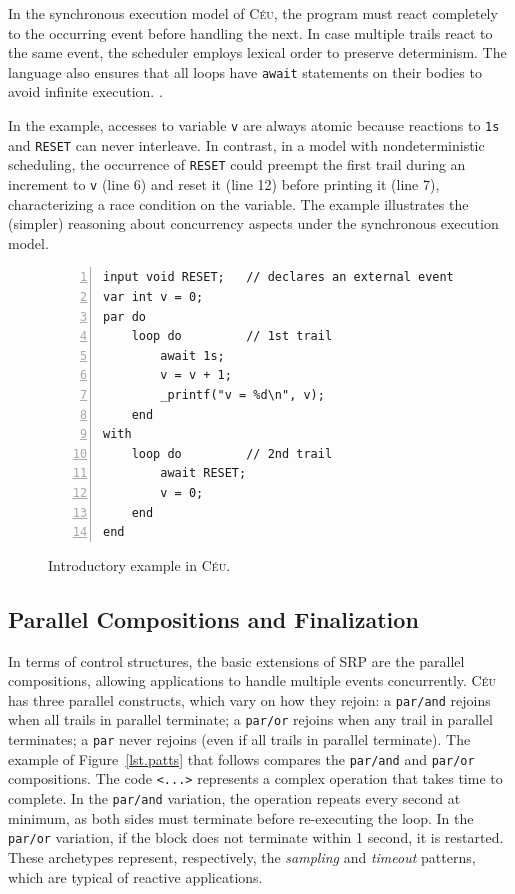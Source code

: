 \documentclass{acm_proc_article-sp}
\newcommand{\CEU}{\textsc{C\'{e}u}\xspace}
\newcommand{\code}[1] {{\small{\texttt{#1}}}}
\newcommand{\1}{\;}
\newcommand{\2}{\;\;}
\newcommand{\3}{\;\;\;}
\newcommand{\5}{\;\;\;\;\;}
\begin{document}
In the synchronous execution model of \CEU, the program must react completely 
to the occurring event before handling the next.
%
In case multiple trails react to the same event, the scheduler employs lexical 
order to preserve determinism.
%
The language also ensures that all loops have \code{await} statements on their 
bodies to avoid infinite execution.
\cite{ceu.sensys13}.

In the example, accesses to variable \code{v} are always atomic because 
reactions to \code{1s} and \code{RESET} can never interleave.
%
In contrast, in a model with nondeterministic scheduling, the occurrence of 
\code{RESET} could preempt the first trail during an increment to \code{v} 
(line 6) and reset it (line 12) before printing it (line 7), characterizing a 
race condition on the variable.
%
The example illustrates the (simpler) reasoning about concurrency aspects under 
the synchronous execution model.

\begin{figure}[t]
\begin{lstlisting}[numbers=left,xleftmargin=3em]
input void RESET;   // declares an external event
var int v = 0;
par do
    loop do         // 1st trail
        await 1s;
        v = v + 1;
        _printf("v = %d\n", v);
    end
with
    loop do         // 2nd trail
        await RESET;
        v = 0;
    end
end
\end{lstlisting}
\caption{ Introductory example in \CEU.
\label{lst.intro}
}
\end{figure}

\subsection{Parallel Compositions and Finalization}

In terms of control structures, the basic extensions of SRP are the parallel 
compositions, allowing applications to handle multiple events concurrently.
%
\CEU has three parallel constructs, which vary on how they rejoin:
a \code{par/and} rejoins when all trails in parallel terminate;
a \code{par/or} rejoins when any trail in parallel terminates;
a \code{par} never rejoins (even if all trails in parallel terminate).
%
The example of Figure~\ref{lst.patts} that follows compares the \code{par/and} 
and \code{par/or} compositions.
%
The code \code{<...>} represents a complex operation that takes time to 
complete.
%
In the \code{par/and} variation, the operation repeats every second at minimum, 
as both sides must terminate before re-executing the loop.
In the \code{par/or} variation, if the block does not terminate within 1 
second, it is restarted.
%
These archetypes represent, respectively, the \emph{sampling} and 
\emph{timeout} patterns, which are typical of reactive applications.
\end{document}

